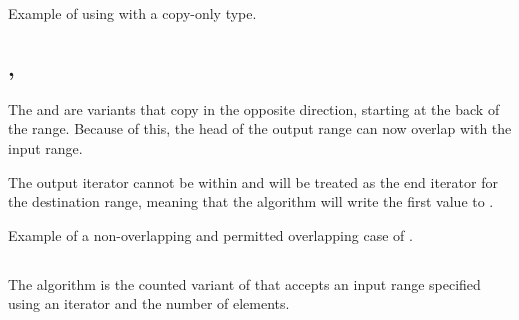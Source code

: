 \begin{codebox}[]{\href{https://compiler-explorer.com/z/9ejzxEr8K}{\ExternalLink}}
\footnotesize Example of using  with a copy-only type.
\tcblower
{}
\end{codebox}

\subsection{\texorpdfstring{, }{\texttt{std::copy\_backward}, \texttt{std::move\_backward}}}

The  and  are variants that copy in the opposite direction, starting at the back of the range. Because of this, the head of the output range can now overlap with the input range.



The output iterator cannot be within \cpp{(first, last]} and will be treated as the end iterator for the destination range, meaning that the algorithm will write the first value to .

\begin{codebox}[]{\href{https://compiler-explorer.com/z/TThv49Gqa}{\ExternalLink}}
\footnotesize Example of a non-overlapping and permitted overlapping case of .
\tcblower
{}
\end{codebox}

\subsection{\texorpdfstring{}{\texttt{std::copy\_n}}}

The  algorithm is the counted variant of  that accepts an input range specified using an iterator and the number of elements.


